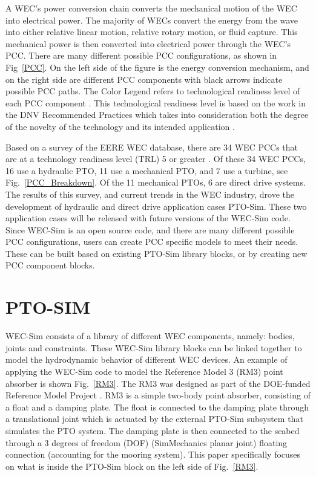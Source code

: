 \documentclass[twocolumn,10pt]{asme2e}
\begin{document}
A WEC's power conversion chain converts the mechanical motion of the WEC into electrical power. The majority of WECs convert the energy from the wave into either relative linear motion, relative rotary motion, or fluid capture. This mechanical power is then converted into electrical power through the WEC's PCC. There are many different possible PCC configurations, as shown in Fig~\ref{PCC}. On the left side of the figure is the energy conversion mechanism, and on the right side are different PCC components with black arrows indicate possible PCC paths. The Color Legend refers to technological readiness level of each PCC component \cite{reed2010accelerating}\cite{ruehl2012wave}. This technological readiness level is based on the work in the DNV Recommended Practices which takes into consideration both the degree of the novelty of the technology and its intended application \cite{veritas2001recommended}. 

Based on a survey of the EERE WEC database, there are 34 WEC PCCs that are at a technology readiness level (TRL) 5 or greater \cite{eere}. Of these 34 WEC PCCs, 16 use a hydraulic PTO, 11 use a mechanical PTO, and 7 use a turbine, see Fig.~\ref{PCC_Breakdown}. Of the 11 mechanical PTOs, 6 are direct drive systems. The results of this survey, and current trends in the WEC industry, drove the development of hydraulic and direct drive application cases PTO-Sim. These two application cases will be released with future versions of the WEC-Sim code. Since WEC-Sim is an open source code, and there are many different possible PCC configurations, users can create PCC specific models to meet their needs. These can be built based on existing PTO-Sim library blocks, or by creating new PCC component blocks.


\section*{PTO-SIM}

WEC-Sim consists of a library of different WEC components, namely: bodies, joints and constraints. These WEC-Sim library blocks can be linked together to model the hydrodynamic behavior of different WEC devices. An example of applying the WEC-Sim code to model the Reference Model 3 (RM3) point absorber is shown Fig.~\ref{RM3}. The RM3 was designed as part of the DOE-funded Reference Model Project \cite{sandia}. RM3 is a simple two-body point absorber, consisting of a float and a damping plate. The float is connected to the damping plate through a translational joint which is actuated by the external PTO-Sim subsystem that simulates the PTO system. The damping plate is then connected to the seabed through a 3 degrees of freedom (DOF) (SimMechanics planar joint) floating connection (accounting for the mooring system). This paper specifically focuses on what is inside the PTO-Sim block on the left side of Fig.~\ref{RM3}.
\end{document}
